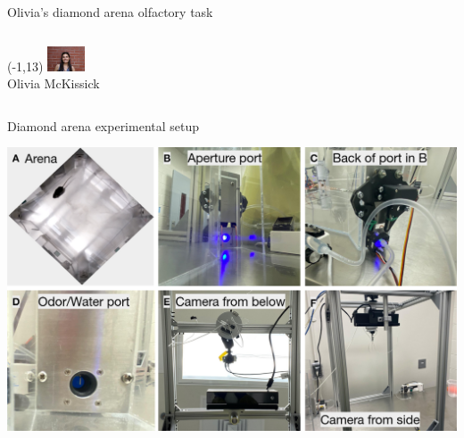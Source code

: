 \documentclass[bigger]{beamer}
\begin{document}
\begin{frame}[label={sec:org047aefd}]{Olivia's diamond arena olfactory task}
\begin{columns}
\begin{column}[t]{0.5\columnwidth}
\begin{textblock}{5}(-1,13)
\center
\includegraphics[width=3em]{img/olivia.jpg}\\
\scriptsize
Olivia McKissick
\end{textblock}
\end{column}
\end{columns}
\end{frame}

\begin{frame}[label={sec:org3b70935}]{Diamond arena experimental setup}
\begin{center}
\includegraphics[width=.9\linewidth]{img/physical-diamond-arena.png}
\end{center}
\end{frame}
\end{document}

